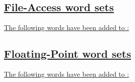 \hfill
\begin{minipage}[t]{0.35\linewidth}
\uline{} \\
\uline{} \\
\uline{} \\
\uline{} \\
\uline{} \\
\uline{} \\
\uline{} \\
\uline{} \\
\uline{}
\end{minipage}

\subsection[{File-Access word sets}]{\uline{File-Access word sets}}
\uline{The following words have been added to :}

\begin{minipage}[t]{0.3\linewidth}
\uline{}
\end{minipage}
\hfill
\begin{minipage}[t]{0.3\linewidth}
\uline{}
\end{minipage}
\hfill
\begin{minipage}[t]{0.3\linewidth}
\uline{}
\end{minipage}

\subsection[{Floating-Point word sets}]{\uline{Floating-Point word sets}}
\uline{The following words have been added to :}

\begin{minipage}[t]{0.3\linewidth}
\uline{} \\
\uline{} \\
\uline{}
\end{minipage}
\hfill
\begin{minipage}[t]{0.3\linewidth}
\uline{} \\
\uline{}
\end{minipage}
\hfill
\begin{minipage}[t]{0.3\linewidth}
\uline{} \\
\uline{}
\end{minipage}

